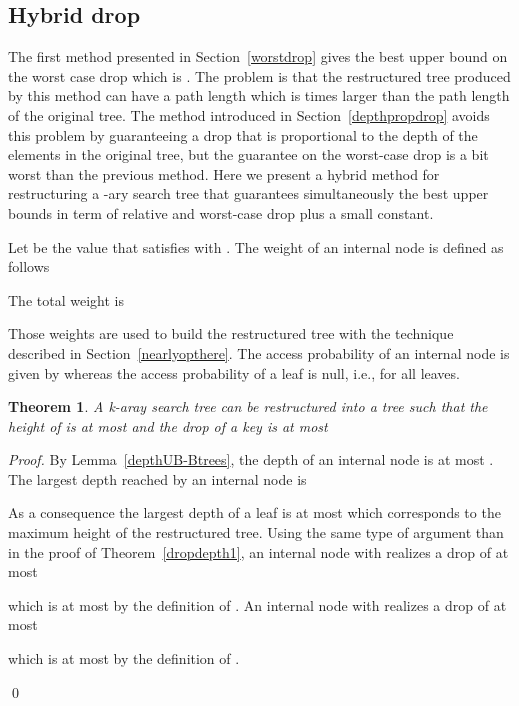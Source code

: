 \documentclass{llncs}\usepackage[english]{babel}
\newtheorem{thm}{Theorem}
\begin{document}
\subsection{Hybrid drop}
\label{hybrid}
The first method presented in Section~\ref{worstdrop} gives the best upper bound on the worst case drop which is . The problem is that the restructured tree produced by this method can have a path length which is  times larger than the path length of the original tree. The method introduced in Section~\ref{depthpropdrop} avoids this problem by guaranteeing a drop that is proportional to the depth of the elements in the original tree, but the guarantee on the worst-case drop is a bit worst than the previous method. Here we present a hybrid method for restructuring a -ary search tree that guarantees simultaneously the best upper bounds in term of relative and worst-case drop plus a small constant. 

Let  be the value that satisfies  with . The weight of an internal node  is defined as follows
\vspace{-0.2cm}

The total weight is 
\vspace{-0.2cm}


Those weights are used to build the restructured tree  with the technique described in Section~\ref{nearlyopthere}. The access probability of an internal node  is given by  whereas the access probability of a leaf is null, i.e.,  for all leaves.

\begin{thm}
A k-aray search tree  can be restructured into a tree  such that the height of  is at most  and the drop of a key  is at most 
\vspace{-0.2cm}

\end{thm}
\begin{proof}
By Lemma~\ref{depthUB-Btrees}, the depth of an internal node  is at most . The largest depth reached by an internal node is 

 
As a consequence the largest depth of a leaf is at most  which corresponds to the maximum height of the restructured tree.
Using the same type of argument than in the proof of Theorem~\ref{dropdepth1}, an internal node  with  realizes a drop of at most 

which is at most  by the definition of .
An internal node  with  realizes a drop of at most 

which is at most  by the definition of .

\qed \end{proof}
\end{document}
